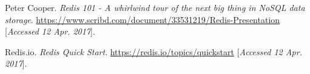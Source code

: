 \documentclass[11pt]{article}
\begin{document}
\begin{thebibliography}{9}
	Peter Cooper.
	\textit{Redis 101 - A whirlwind tour of the next big thing in NoSQL data storage}. 
	\url {https://www.scribd.com/document/33531219/Redis-Presentation}
	[\textit{Accessed 12 Apr. 2017}]. 
								
	Redis.io.
	\textit{Redis Quick Start}. 
	\url {https://redis.io/topics/quickstart}
	[\textit{Accessed 12 Apr. 2017}].
								

								
\end{thebibliography}
\end{document}

